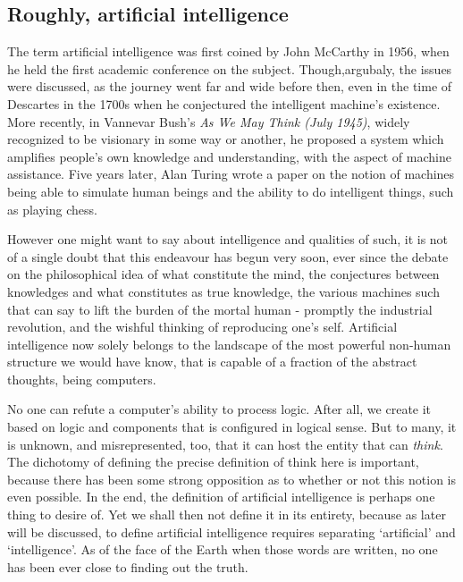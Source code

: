 \subsection{Roughly, artificial intelligence}

The term artificial intelligence was first coined by John McCarthy in 1956, when he held the first academic conference on the subject. Though,argubaly, the issues were discussed, as the journey went far and wide before then, even in the time of Descartes in the 1700s when he conjectured the intelligent machine's existence. More recently, in Vannevar Bush's \textit{As We May Think (July 1945)}, widely recognized to be visionary in some way or another, he proposed a system which amplifies people's own knowledge and understanding, with the aspect of machine assistance. Five years later, Alan Turing wrote a paper on the notion of machines being able to simulate human beings and the ability to do intelligent things, such as playing chess. 

However one might want to say about intelligence and qualities of such, it is not of a single doubt that this endeavour has begun very soon, ever since the debate on the philosophical idea of what constitute the mind, the conjectures between knowledges and what constitutes as true knowledge, the various machines such that can say to lift the burden of the mortal human - promptly the industrial revolution, and the wishful thinking of reproducing one's self. Artificial intelligence now solely belongs to the landscape of the most powerful non-human structure we would have know, that is capable of a fraction of the abstract thoughts, being computers. 

No one can refute a computer's ability to process logic. After all, we create it based on logic and components that is configured in logical sense. But to many, it is unknown, and misrepresented, too, that it can host the entity that can \textit{think}. The dichotomy of defining the precise definition of think here is important, because there has been some strong opposition as to whether or not this notion is even possible. In the end, the definition of artificial intelligence is perhaps one thing to desire of. Yet we shall then not define it in its entirety, because as later will be discussed, to define artificial intelligence requires separating `artificial' and `intelligence'. As of the face of the Earth when those words are written, no one has been ever close to finding out the truth. 
